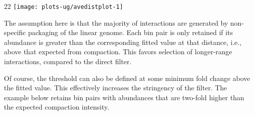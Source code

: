 \documentclass{report}\usepackage[]{graphicx}\usepackage[usenames,dvipsnames]{color}
\makeatletter
\def\maxwidth{ %
  \ifdim\Gin@nat@width>\linewidth
    \linewidth
  \else
    \Gin@nat@width
  \fi
}
\newcommand{\hlnum}[1]{\textcolor[rgb]{0.816,0.125,0.439}{#1}}%
\newcommand{\hlstr}[1]{\textcolor[rgb]{0.251,0.627,0.251}{#1}}%
\newcommand{\hlopt}[1]{\textcolor[rgb]{0,0,0}{#1}}%
\newcommand{\hlstd}[1]{\textcolor[rgb]{0.251,0.251,0.251}{#1}}%
\newcommand{\hlkwb}[1]{\textcolor[rgb]{0,0,0}{#1}}%
\newcommand{\hlkwc}[1]{\textcolor[rgb]{0.251,0.251,0.251}{#1}}%
\newcommand{\hlkwd}[1]{\textcolor[rgb]{0.878,0.439,0.125}{#1}}%
\newenvironment{knitrout}{}{} %
\makeatother
\begin{document}
\begin{knitrout}
\color{fgcolor}\begin{adjustwidth}{2\fltoffset}{2\fltoffset}
\texttt{[image: plots-ug/avedistplot-1]} \end{adjustwidth}
\end{knitrout}

The assumption here is that the majority of interactions are generated by non-specific packaging of the linear genome.
Each bin pair is only retained if its abundance is greater than the corresponding fitted value at that distance, i.e., above that expected from compaction. 
This favors selection of longer-range interactions, compared to the direct filter.

\begin{knitrout}
\color{fgcolor}
\end{knitrout}

Of course, the threshold can also be defined at some minimum fold change above the fitted value.
This effectively increases the stringency of the filter.
The example below retains bin pairs with abundances that are two-fold higher than the expected compaction intensity.
\end{document}
